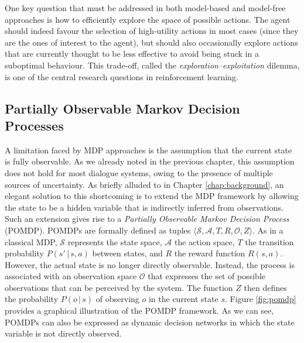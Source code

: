  
One key question that must be addressed in both model-based and model-free approaches is how  to efficiently explore the space of possible actions.  The agent should indeed favour the selection of high-utility actions in most cases (since they are the ones of interest to the agent), but should also occasionally explore actions that are currently thought to be less effective to avoid being stuck in a suboptimal behaviour. This trade-off, called the \textit{exploration--exploitation} dilemma, is one of the central research questions in reinforcement learning. 


\subsection{Partially Observable Markov Decision Processes}
\label{sec:pomdp}

A limitation faced by MDP approaches is the assumption that the current state is fully observable. As we already noted in the previous chapter, this assumption does not hold for most dialogue systems, owing to the presence of multiple sources of uncertainty.  As briefly alluded to in Chapter \ref{chap:background}, an elegant solution to this shortcoming is to extend the MDP framework by allowing the state to be a hidden variable that is indirectly inferred from observations.  Such an extension gives rise to a  \textit{Partially Observable Markov Decision Process} (POMDP).  POMDPs are formally defined as tuples $\langle \mathcal{S}, \mathcal{A}, T, R, \mathcal{O}, Z \rangle$.  As in a classical MDP, $\mathcal{S}$ represents the state space, $\mathcal{A}$ the action space, $T$ the transition probability $P(s'\, | \, s,a)$ between states, and $R$ the reward function $R(s,a)$.  However, the actual state is no longer directly observable.  Instead, the process is associated with an observation space $\mathcal{O}$ that expresses the set of possible observations that can be perceived by the system. The function $Z$ then defines the probability $P(o\, |\, s)$ of observing $o$ in the current state $s$.  Figure \ref{fig:pomdp} provides a graphical illustration of the POMDP framework.  As we can see, POMDPs can also be expressed as dynamic decision networks in which the state variable is not directly observed. 

